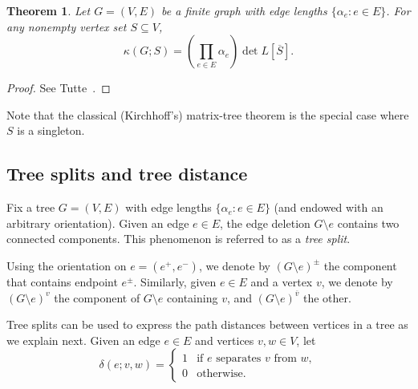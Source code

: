 \documentclass[12pt]{amsart}
\newtheorem{thm}{Theorem}[section]
\theoremstyle{definition}
\begin{document}
\begin{thm}
\label{thm:matrix-tree}
Let $G = (V,E)$ be a finite graph with edge lengths $\{ \alpha_e \colon e \in E\}$.
For any nonempty vertex set $S \subseteq V$,
\begin{equation*}
	\kappa( G ; S) = \left(\prod_{e \in E} \alpha_e \right) \det L[\overline S] .
\end{equation*}
\end{thm}
\begin{proof}
See Tutte~\cite[Section VI.6, Equation (VI.6.7)]{tutte}.
\end{proof}
Note that the classical (Kirchhoff's) matrix-tree theorem is the special case where $S$ is a singleton.

\subsection{Tree splits and tree distance}
\label{sec:tree-splits}

Fix a tree $G = (V,E)$ with edge lengths $\{ \alpha_e \colon e \in E\}$ (and endowed with an arbitrary orientation). Given an edge $e \in E$, the edge deletion $G \setminus e$ contains two connected components. This phenomenon is referred to as a {\em tree split}.

Using the orientation on $e = (e^+,e^-)$,
we denote by $(G \setminus e)^\pm$ the component that contains endpoint $e^\pm$. Similarly, given $e\in E$ and a vertex $v$, we denote by $(G \setminus e)^{v}$ the component of $G\setminus e$ containing $v$, and $(G\setminus e)^{\overline v}$ the other.

Tree splits can be used to express the path distances between vertices in a tree as we explain next.
Given an edge $e\in E$ and vertices $v,w \in V$, let 
\begin{equation*}
\delta(e;v,w) = \begin{cases}
	1 &\text{if $e$ separates  $v$ from $w$}, \\
	0 &\text{otherwise}.
\end{cases}
\end{equation*}
\end{document}
